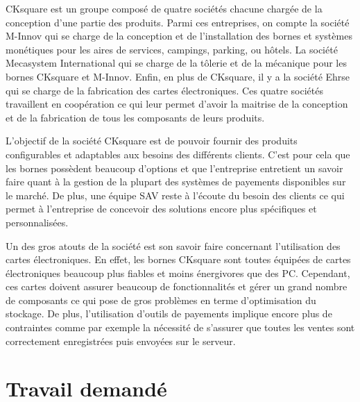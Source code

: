 \documentclass[a4paper]{article}
\begin{document}
CKsquare est un groupe composé de quatre sociétés chacune chargée de la
conception d'une partie des produits. Parmi ces entreprises, on compte la
société M-Innov qui se charge de la conception et de l'installation des bornes
et systèmes monétiques pour les aires de services, campings, parking, ou hôtels.
La société Mecasystem International qui se charge de la tôlerie et de la
mécanique pour les bornes CKsquare et M-Innov. Enfin, en plus de CKsquare, il y
a la société Ehrse qui se charge de la fabrication des cartes électroniques. Ces
quatre sociétés travaillent en coopération ce qui leur permet d'avoir la
maitrise de la conception et de la fabrication de tous les composants de leurs
produits.

L'objectif de la société CKsquare est de pouvoir fournir des produits
configurables et adaptables aux besoins des différents clients. C'est pour cela
que les bornes possèdent beaucoup d'options et que l'entreprise entretient un
savoir faire quant à la gestion de la plupart des systèmes de payements
disponibles sur le marché. De plus, une équipe SAV reste à l'écoute du besoin
des clients ce qui permet à l'entreprise de concevoir des solutions encore plus
spécifiques et personnalisées.

Un des gros atouts de la société est son savoir faire concernant l'utilisation
des cartes électroniques. En effet, les bornes CKsquare sont toutes équipées de
cartes électroniques beaucoup plus fiables et moins énergivores que des PC.
Cependant, ces cartes doivent assurer beaucoup de fonctionnalités et gérer un
grand nombre de composants ce qui pose de gros problèmes en terme d'optimisation
du stockage. De plus, l'utilisation d'outils de payements implique encore plus
de contraintes comme par exemple la nécessité de s'assurer que toutes les ventes
sont correctement enregistrées puis envoyées sur le serveur. %
\section{Travail demandé}%

\end{document}

